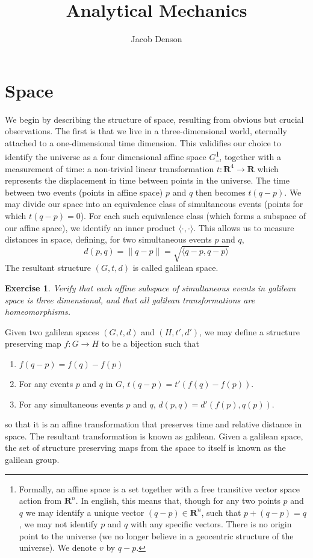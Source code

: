 \documentclass{article}
\title{Analytical Mechanics}
\author{Jacob Denson}
\newtheorem{exercise}{Exercise}
\begin{document}
\section{Space}



We begin by describing the structure of space, resulting from obvious but crucial observations. The first is that we live in a three-dimensional world, eternally attached to a one-dimensional time dimension. This validifies our choice to identify the universe as a four dimensional affine space $G$\footnote{Formally, an affine space is a set together with a free transitive vector space action from $\mathbf{R}^n$. In english, this means that, though for any two points $p$ and $q$ we may identify a unique vector $(q - p) \in \mathbf{R}^n$, such that $p + (q - p) = q$, we may not identify $p$ and $q$ with any specific vectors. There is no origin point to the universe (we no longer believe in a geocentric structure of the universe). We denote $v$ by $q - p$.}, together with a measurement of time: a non-trivial linear transformation $t:\mathbf{R}^4 \to \mathbf{R}$ which represents the displacement in time between points in the universe. The time between two events (points in affine space) $p$ and $q$ then becomes $t(q - p)$. We may divide our space into an equivalence class of simultaneous events (points for which $t(q - p) = 0$). For each such equivalence class (which forms a subspace of our affine space), we identify an inner product $\langle \cdot, \cdot \rangle$. This allows us to measure distances in space, defining, for two simultaneous events $p$ and $q$,
%
\[ d(p,q) = \| q - p \| = \sqrt{\langle q - p, q - p \rangle} \]
%
The resultant structure $(G,t,d)$ is called galilean space.

\begin{exercise} Verify that each affine subspace of simultaneous events in galilean space is three dimensional, and that all galilean transformations are homeomorphisms. \end{exercise}

Given two galilean spaces $(G,t,d)$ and $(H,t',d')$, we may define a structure preserving map $f:G \to H$ to be a bijection such that
%
\begin{enumerate}
    \item $f(q - p) = f(q) - f(p)$
    \item For any events $p$ and $q$ in $G$, $t(q - p) = t'(f(q) - f(p))$.
    \item For any simultaneous events $p$ and $q$, $d(p,q) = d'(f(p),q(p))$.
\end{enumerate}
%
so that it is an affine transformation that preserves time and relative distance in space. The resultant transformation is known as galilean. Given a galilean space, the set of structure preserving maps from the space to itself is known as the galilean group.
\end{document}
